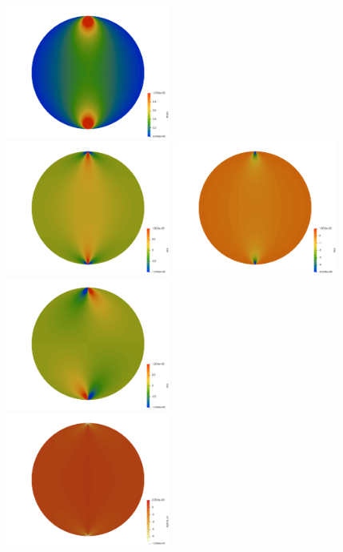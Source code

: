 \begin{center}
\includegraphics[width=5.4cm]{python_codes/fieldstone_58/experiment1/111/e}\\
\includegraphics[width=5.4cm]{python_codes/fieldstone_58/experiment1/111/exx}
\includegraphics[width=5.4cm]{python_codes/fieldstone_58/experiment1/111/eyy}
\includegraphics[width=5.4cm]{python_codes/fieldstone_58/experiment1/111/exy}\\
\includegraphics[width=5.4cm]{python_codes/fieldstone_58/experiment1/111/sigma_xx}

\end{center}
